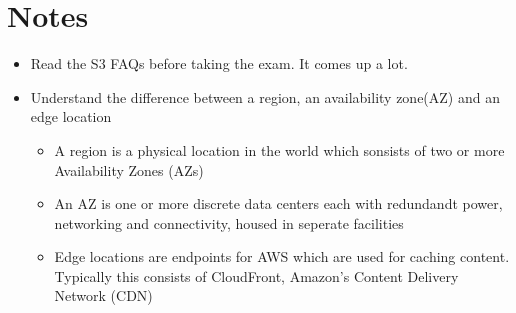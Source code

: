\documentclass{article}
\begin{document}
\section{Notes}
\begin{itemize}
\item
Read the S3 FAQs before taking the exam. It comes up a lot.

\item
Understand the difference between a region, an availability zone(AZ) and an edge location
	\begin{itemize}
	\item
	A region is a physical location in the world which sonsists of two or more Availability Zones (AZs)

	\item
	An AZ is one or more discrete data centers each with redundandt power, networking and connectivity, housed in seperate facilities

	\item
	Edge locations are endpoints for AWS which are used for caching content. Typically this consists of CloudFront, Amazon's Content Delivery Network (CDN)
\end{itemize}


\end{itemize}
\end{document}
